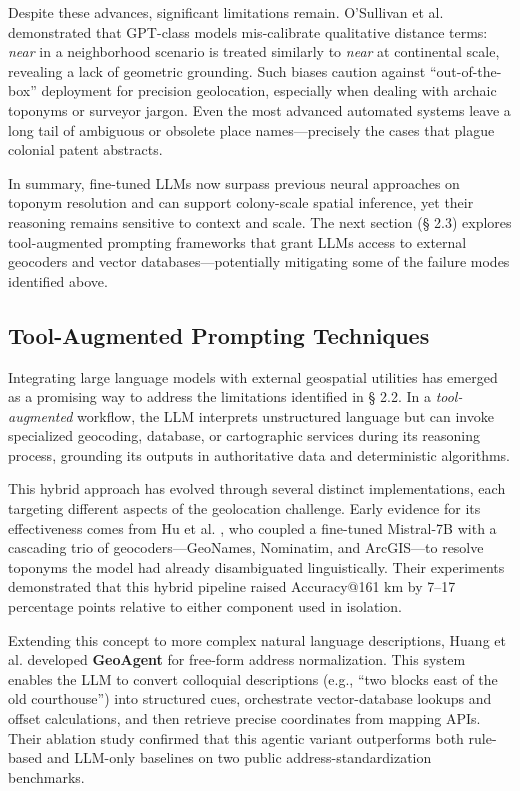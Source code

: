 Despite these advances, significant limitations remain. O'Sullivan et
al. \citep{Osullivan2024_metric} demonstrated that GPT-class models
mis-calibrate qualitative distance terms: \emph{near} in a neighborhood
scenario is treated similarly to \emph{near} at continental scale,
revealing a lack of geometric grounding. Such biases caution against
``out-of-the-box'' deployment for precision geolocation, especially when
dealing with archaic toponyms or surveyor jargon. Even the most advanced
automated systems leave a long tail of ambiguous or obsolete place
names---precisely the cases that plague colonial patent abstracts.

In summary, fine-tuned LLMs now surpass previous neural approaches on
toponym resolution and can support colony-scale spatial inference, yet
their reasoning remains sensitive to context and scale. The next section
(§ 2.3) explores tool-augmented prompting frameworks that grant LLMs
access to external geocoders and vector databases---potentially
mitigating some of the failure modes identified above.

\subsection{Tool-Augmented Prompting
Techniques}\label{tool-augmented-prompting-techniques}

Integrating large language models with external geospatial utilities has
emerged as a promising way to address the limitations identified in §
2.2. In a \emph{tool-augmented} workflow, the LLM interprets
unstructured language but can invoke specialized geocoding, database, or
cartographic services during its reasoning process, grounding its
outputs in authoritative data and deterministic algorithms.

This hybrid approach has evolved through several distinct
implementations, each targeting different aspects of the geolocation
challenge. Early evidence for its effectiveness comes from Hu et al.
\citep{Hu2024_toponym_llm}, who coupled a fine-tuned Mistral-7B with a
cascading trio of geocoders---GeoNames, Nominatim, and ArcGIS---to
resolve toponyms the model had already disambiguated linguistically.
Their experiments demonstrated that this hybrid pipeline raised
Accuracy@161 km by 7--17 percentage points relative to either component
used in isolation.

Extending this concept to more complex natural language descriptions,
Huang et al. \citep{Huang2024_geoagent} developed \textbf{GeoAgent} for
free-form address normalization. This system enables the LLM to convert
colloquial descriptions (e.g., ``two blocks east of the old
courthouse'') into structured cues, orchestrate vector-database lookups
and offset calculations, and then retrieve precise coordinates from
mapping APIs. Their ablation study confirmed that this agentic variant
outperforms both rule-based and LLM-only baselines on two public
address-standardization benchmarks.

